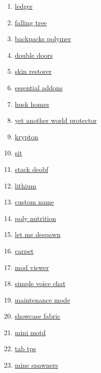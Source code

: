 \begin{enumerate}
    \item \href{https://github.com/QuiltServerTools/Ledger}{ledger}
    \item \href{https://github.com/RakambdaOrg/FallingTree}{falling tree}
    \item \href{https://github.com/Rouesvm/Backpacks-Polymer}{backpacks polymer}
    \item \href{https://github.com/Serilum/Double-Doors}{double doors}
    \item \href{https://github.com/Suiranoil/SkinRestorer}{skin restorer}
    \item \href{https://github.com/Super-Santa/EssentialAddons}{essential addons}
    \item \href{https://github.com/WiIIiam278/HuskHomes/}{husk homes}
    \item \href{https://github.com/Z0rdak/Yet-Another-World-Protector}{yet another world protector}
    \item \href{https://github.com/astei/krypton}{krypton}
    \item \href{https://github.com/bl4ckscor3/Sit}{sit}
    \item \href{https://github.com/booky10/StackDeobfuscator}{stack deobf}
    \item \href{https://github.com/caffeinemc/lithium-fabric}{lithium}
    \item \href{https://github.com/eclipseisoffline/customname/}{custom name}
    \item \href{https://github.com/elytrafae/PolyNutrition}{poly nutrition}
    \item \href{https://github.com/frikinjay/let-me-despawn}{let me despawn}
    \item \href{https://github.com/gnembon/fabric-carpet}{carpet}
    \item \href{https://github.com/haykam821/Mod-Viewer}{mod viewer}
    \item \href{https://github.com/henkelmax/simple-voice-chat}{simple voice chat}
    \item \href{https://github.com/hypherionmc/MaintenanceMode}{maintenance mode}
    \item \href{https://github.com/jiazengp/showcase-fabric}{showcase fabric}
    \item \href{https://github.com/jpenilla/MiniMOTD}{mini motd}
    \item \href{https://github.com/jpenilla/TabTPS}{tab tps}
    \item \href{https://github.com/katanya04/mine-spawners}{mine spawners}

\end{enumerate}
